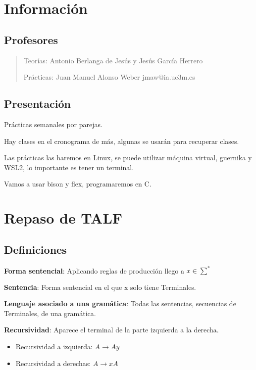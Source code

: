 \documentclass[12pt, twoside, openright]{report} %
\begin{document}

\chapter{Información}
\section{Profesores}

\begin{quote}
	Teorías: Antonio Berlanga de Jesús y Jesús García Herrero

	Prácticas: Juan Manuel Alonso Weber jmaw@ia.uc3m.es
\end{quote}

\section{Presentación}

Prácticas semanales por parejas.

Hay clases en el cronograma de más, algunas se usarán para recuperar clases.

Las prácticas las haremos en Linux, se puede utilizar máquina virtual, guernika y WSL2, lo importante es tener un terminal.

Vamos a usar bison y flex, programaremos en C.

\chapter{Repaso de TALF}

\section{Definiciones}

\textbf{Forma sentencial}: Aplicando reglas de producción llego a \(x \in \sum^*\)

\textbf{Sentencia}: Forma sentencial en el que x solo tiene Terminales.

\textbf{Lenguaje asociado a una gramática}: Todas las sentencias, secuencias de Terminales, de una gramática.

\textbf{Recursividad}: Aparece el terminal de la parte izquierda a la derecha.

\begin{itemize}
	\item Recursividad a izquierda: $A \rightarrow Ay$
	\item Recursividad a derechas: $A \rightarrow xA$
\end{itemize}
\end{document}
